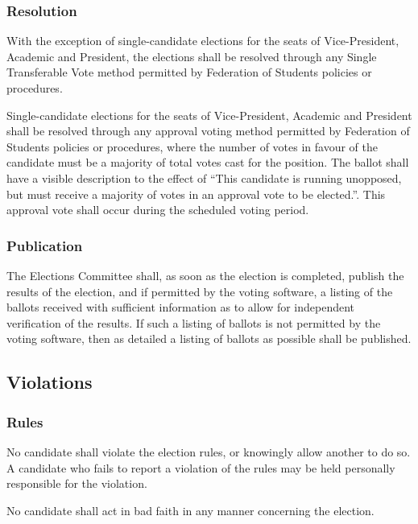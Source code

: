 \subsubsection{Resolution}
With the exception of single-candidate elections for the seats of Vice-President, Academic and President, the elections shall be resolved through any Single Transferable Vote method permitted by Federation of Students policies or procedures.

Single-candidate elections for the seats of Vice-President, Academic and President shall be resolved through any approval voting method permitted by Federation of Students policies or procedures, where the number of votes in favour of the candidate must be a majority of total votes cast for the position. The ballot shall have a visible description to the effect of ``This candidate is running unopposed, but must receive a majority of votes in an approval vote to be elected.''. This approval vote shall occur during the scheduled voting period.

\subsubsection{Publication}
\label{elections:voting:publication}
The Elections Committee shall, as soon as the election is completed, publish the results of the election, and if permitted by the voting software, a listing of the ballots received with sufficient information as to allow for independent verification of the results.
If such a listing of ballots is not permitted by the voting software, then as detailed a listing of ballots as possible shall be published.

\subsection{Violations}
\subsubsection{Rules}
No candidate shall violate the election rules, or knowingly allow another to do so.
A candidate who fails to report a violation of the rules may be held personally responsible for the violation.

No candidate shall act in bad faith in any manner concerning the election.
